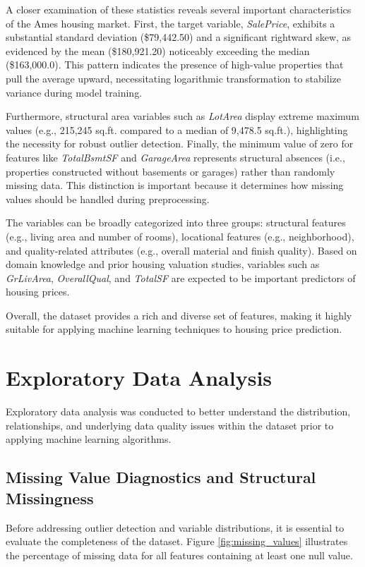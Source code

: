 \documentclass[12pt,a4paper,oneside,openany]{book}
\begin{document}
A closer examination of these statistics reveals several important characteristics of the Ames housing market. First, the target variable, \textit{SalePrice}, exhibits a substantial standard deviation (\$79,442.50) and a significant rightward skew, as evidenced by the mean (\$180,921.20) noticeably exceeding the median (\$163,000.0). This pattern indicates the presence of high-value properties that pull the average upward, necessitating logarithmic transformation to stabilize variance during model training.

Furthermore, structural area variables such as \textit{LotArea} display extreme maximum values (e.g., 215,245 sq.ft. compared to a median of 9,478.5 sq.ft.), highlighting the necessity for robust outlier detection. Finally, the minimum value of zero for features like \textit{TotalBsmtSF} and \textit{GarageArea} represents structural absences (i.e., properties constructed without basements or garages) rather than randomly missing data. This distinction is important because it determines how missing values should be handled during preprocessing.

The variables can be broadly categorized into three groups: structural features (e.g., living area and number of rooms), locational features (e.g., neighborhood), and quality-related attributes (e.g., overall material and finish quality). Based on domain knowledge and prior housing valuation studies, variables such as \textit{GrLivArea}, \textit{OverallQual}, and \textit{TotalSF} are expected to be important predictors of housing prices.

Overall, the dataset provides a rich and diverse set of features, making it highly suitable for applying machine learning techniques to housing price prediction.


\section{Exploratory Data Analysis}

Exploratory data analysis was conducted to better understand the distribution, relationships, and underlying data quality issues within the dataset prior to applying machine learning algorithms.

\subsection{Missing Value Diagnostics and Structural Missingness}

Before addressing outlier detection and variable distributions, it is essential to evaluate the completeness of the dataset. Figure \ref{fig:missing_values} illustrates the percentage of missing data for all features containing at least one null value.
\end{document}
